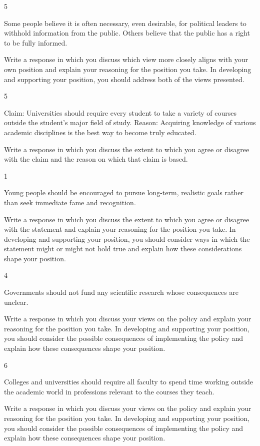 \documentclass[]{article}
\begin{document}
5

Some people believe it is often necessary, even desirable, for political
leaders to withhold information from the public. Others believe that the
public has a right to be fully informed.

Write a response in which you discuss which view more closely aligns
with your own position and explain your reasoning for the position you
take. In developing and supporting your position, you should address
both of the views presented.

5

Claim: Universities should require every student to take a variety of
courses outside the student's major field of study. Reason: Acquiring
knowledge of various academic disciplines is the best way to become
truly educated.

Write a response in which you discuss the extent to which you agree or
disagree with the claim and the reason on which that claim is based.

1

Young people should be encouraged to pursue long-term, realistic goals
rather than seek immediate fame and recognition.

Write a response in which you discuss the extent to which you agree or
disagree with the statement and explain your reasoning for the position
you take. In developing and supporting your position, you should
consider ways in which the statement might or might not hold true and
explain how these considerations shape your position.

4

Governments should not fund any scientific research whose consequences
are unclear.

Write a response in which you discuss your views on the policy and
explain your reasoning for the position you take. In developing and
supporting your position, you should consider the possible consequences
of implementing the policy and explain how these consequences shape your
position.

6

Colleges and universities should require all faculty to spend time
working outside the academic world in professions relevant to the
courses they teach.

Write a response in which you discuss your views on the policy and
explain your reasoning for the position you take. In developing and
supporting your position, you should consider the possible consequences
of implementing the policy and explain how these consequences shape your
position.
\end{document}

